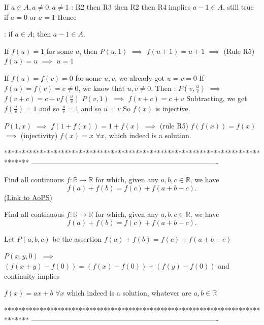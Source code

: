 \begin{solution}
If $a\in A,a\ne 0, a\ne 1$ : R2 then R3 then R2 then R4 implies $a-1\in A$, still true if $a=0$ or $a=1$
Hence  : if $a\in A$; then $a-1\in A$.

If $f(u)=1$ for some $u$, then $P(u,1)$ $\implies$ $f(u+1)=u+1$ $\implies$ (Rule R5) $f(u)=u$ $\implies$ $u=1$

If $f(u)=f(v)=0$ for some $u,v$, we already got $u=v=0$
If $f(u)=f(v)=c\ne 0$, we know that $u,v\ne 0$. Then :
$P(v,\frac uv)$ $\implies$ $f(v+c)=c+vf(\frac uv)$
$P(v,1)$ $\implies$ $f(v+c)=c+v$
Subtracting, we get $f(\frac uv)=1$ and so $\frac uv=1$ and so $u=v$
So $f(x)$ is injective.

$P(1,x)$ $\implies$ $f(1+f(x))=1+f(x)$ $\implies$ (rule R5) $f(f(x))=f(x)$ $\implies$ (injectivity) $\boxed{f(x)=x}$ $\forall x$, which indeed is a solution.
\end{solution}
*******************************************************************************
-------------------------------------------------------------------------------

\begin{problem}
	Find all continuous $f: \mathbb{R} \to \mathbb{R}$ for which, given any $a, b, c \in \mathbb{R}$, we have
\[ f(a) + f(b) = f(c) + f(a+b-c). \]
	\flushright \href{https://artofproblemsolving.com/community/c6h609009}{(Link to AoPS)}
\end{problem}



\begin{solution}
	\begin{tcolorbox}Find all continuous $f: \mathbb{R} \to \mathbb{R}$ for which, given any $a, b, c \in \mathbb{R}$, we have
\[ f(a) + f(b) = f(c) + f(a+b-c). \]\end{tcolorbox}
Let $P(a,b,c)$ be the assertion $f(a)+f(b)=f(c)+f(a+b-c)$

$P(x,y,0)$ $\implies$ $(f(x+y)-f(0))=(f(x)-f(0))+(f(y)-f(0))$ and continuity implies 

$\boxed{f(x)=ax+b}$ $\forall x$ which indeed is a solution, whatever are $a,b\in\mathbb R$
\end{solution}
*******************************************************************************
-------------------------------------------------------------------------------

